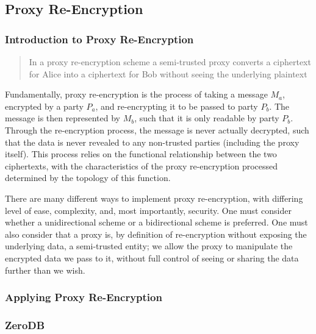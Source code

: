 \subsection{Proxy Re-Encryption}

\subsubsection{Introduction to Proxy Re-Encryption}

\blockquote{In a proxy re-encryption scheme a semi-trusted proxy converts a ciphertext for Alice into a ciphertext for Bob without seeing the underlying plaintext}\autocite{greenateniese:2006:article}

Fundamentally, proxy re-encryption is the process of taking a message $M_a$, encrypted by a party $P_a$, and re-encrypting it to be passed to party $P_b$. The message is then represented by $M_b$, such that it is only readable by party $P_b$. Through the re-encryption process, the message is never actually decrypted, such that the data is never revealed to any non-trusted parties (including the proxy itself). This process relies on the functional relationship between the two ciphertexts, with the characteristics of the proxy re-encryption processed determined by the topology of this function.



There are many different ways to implement proxy re-encryption, with differing level of ease, complexity, and, most importantly, security. One must consider whether a unidirectional scheme or a bidirectional scheme is preferred. One must also consider that a proxy is, by definition of re-encryption without exposing the underlying data, a semi-trusted entity; we allow the proxy to manipulate the encrypted data we pass to it, without full control of seeing or sharing the data further than we wish.

\subsubsection{Applying Proxy Re-Encryption}



\subsubsection{ZeroDB}
